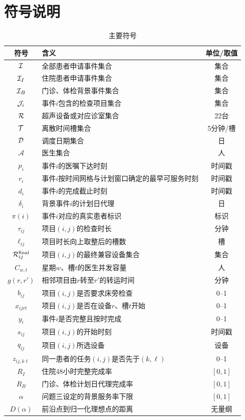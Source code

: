 \section{符号说明}

\begin{table}[H]
\centering
\caption{主要符号}
\begin{tabularx}{\textwidth}{cXc}
\toprule
符号 & 含义 & 单位/取值 \\
\midrule
$\mathcal{I}$ & 全部患者申请事件集合 & 集合 \\
$\mathcal{I}_I$ & 住院患者申请事件集合 & 集合 \\
$\mathcal{I}_B$ & 门诊、体检背景事件集合 & 集合 \\
$\mathcal{J}_i$ & 事件$i$包含的检查项目集合 & 集合 \\
$\mathcal{R}$ & 超声设备或对应诊室集合 & 22台 \\
$\mathcal{T}$ & 离散时间槽集合 & 5分钟/槽 \\
$\mathcal{D}$ & 调度日期集合 & 日 \\
$\mathcal A$ & 医生集合 & 人 \\
$p_i$ & 事件$i$的医嘱下达时刻 & 时间戳 \\
$r_i$ & 事件$i$按时间网格与计划窗口确定的最早可服务时刻 & 时间戳 \\
$d_i$ & 事件$i$的完成截止时刻 & 时间戳 \\
$\delta_i$ & 背景事件$i$的计划日代理 & 日 \\
$\pi(i)$ & 事件$i$对应的真实患者标识 & 标识 \\
$\tau_{ij}$ & 项目$(i,j)$的检查时长 & 分钟 \\
$\ell_{ij}$ & 项目时长向上取整后的槽数 & 槽 \\
$\mathcal{R}_{ij}^{\mathrm{final}}$ & 项目$(i,j)$的最终兼容设备集合 & 集合 \\
$C_{w,t}$ & 星期$w$、槽$t$的医生并发容量 & 人 \\
$g(r,r')$ & 相邻项目由$r$转至$r'$的转运时间 & 分钟 \\
$b_{ij}$ & 项目$(i,j)$是否要求床旁检查 & 0--1 \\
$x_{ijrt}$ & 项目$(i,j)$是否在设备$r$、槽$t$开始 & 0--1 \\
$y_i$ & 事件$i$是否完整且按时完成 & 0--1 \\
$s_{ij}$ & 项目$(i,j)$的开始时刻 & 时间戳 \\
$q_{ij}$ & 项目$(i,j)$所选设备 & 设备 \\
$z_{ij,k\ell}$ & 同一患者的任务$(i,j)$是否先于$(k,\ell)$ & 0--1 \\
$R_I$ & 住院48小时完整完成率 & $[0,1]$ \\
$R_B$ & 门诊、体检计划日代理完成率 & $[0,1]$ \\
$\alpha$ & 问题三设定的背景服务率下限 & $[0,1]$ \\
$D(\alpha)$ & 前沿点到归一化理想点的距离 & 无量纲 \\
\bottomrule
\end{tabularx}
\end{table}
